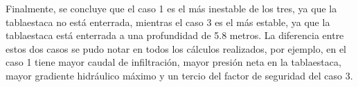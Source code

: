 \documentclass{article}
\begin{document}
Finalmente, se concluye que el caso 1 es el más inestable de los tres, ya que la tablaestaca no está enterrada, mientras el caso 3 es el más estable, ya que la tablaestaca está enterrada a una profundidad de 5.8 metros. La diferencia entre estos dos casos se pudo notar en todos los cálculos realizados, por ejemplo, en el caso 1 tiene mayor caudal de infiltración, mayor presión neta en la tablaestaca, mayor gradiente hidráulico máximo y un tercio del factor de seguridad del caso 3.
\end{document}
